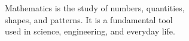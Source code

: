 \documentclass[preview]{standalone}
\begin{document}
\begin{center}
Mathematics is the study of numbers, quantities, \\ shapes, and patterns. It is a fundamental tool \\ used in science, engineering, and everyday life.
\end{center}
\end{document}
